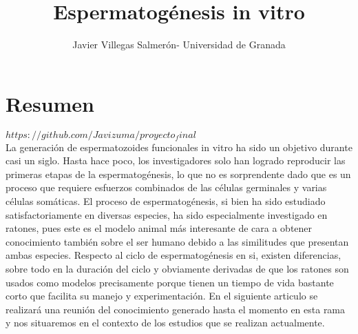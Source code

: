 \documentclass[a4paper,11pt]{article}
\begin{document}
\title{Espermatogénesis in vitro}
\author{Javier Villegas Salmerón- Universidad de Granada}
\maketitle
\section{Resumen}
$https://github.com/Javizuma/proyecto_final$\\
La generación de espermatozoides funcionales in vitro ha sido un objetivo durante casi un siglo. Hasta hace poco, los investigadores solo han logrado reproducir las primeras etapas de la espermatogénesis, lo que no es sorprendente dado que es un proceso que requiere esfuerzos combinados de las células germinales y varias células somáticas.
El proceso de espermatogénesis, si bien ha sido estudiado satisfactoriamente en diversas especies, ha sido especialmente investigado en ratones, pues este es el modelo animal  más interesante de cara a obtener conocimiento también sobre el ser humano debido a las similitudes que presentan ambas especies. Respecto al ciclo de espermatogénesis en si, existen diferencias, sobre todo en la duración del ciclo y obviamente derivadas de que los ratones son usados como modelos  precisamente porque tienen un tiempo de vida bastante corto que facilita su manejo y experimentación. 
En el siguiente articulo se realizará una reunión del conocimiento generado hasta el momento en esta rama y nos situaremos en el contexto de los estudios que se realizan actualmente. 
\end{document}
